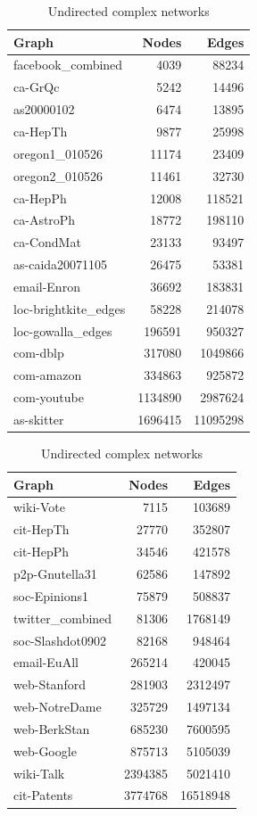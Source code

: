 \begin{table}[h!]
\parbox{.45\linewidth}{
\centering
\begin{tabular}{lrr}

\hline
 Graph                &   Nodes &    Edges \\
\hline
 facebook\_combined    &    4039 &    88234 \\
 ca-GrQc              &    5242 &    14496 \\
 as20000102           &    6474 &    13895 \\
 ca-HepTh             &    9877 &    25998 \\
 oregon1\_010526       &   11174 &    23409 \\
 oregon2\_010526       &   11461 &    32730 \\
 ca-HepPh             &   12008 &   118521 \\
 ca-AstroPh           &   18772 &   198110 \\
 ca-CondMat           &   23133 &    93497 \\
 as-caida20071105     &   26475 &    53381 \\
 email-Enron          &   36692 &   183831 \\
 loc-brightkite\_edges &   58228 &   214078 \\
 loc-gowalla\_edges    &  196591 &   950327 \\
 com-dblp      &  317080 &  1049866 \\
 com-amazon    &  334863 &   925872 \\
 com-youtube   & 1134890 &  2987624 \\
 as-skitter           & 1696415 & 11095298 \\
\hline
\end{tabular}
\caption{Undirected complex networks}

}
\hfill
\parbox{.45\linewidth}{
\centering
\begin{tabular}{lrr}
\hline
 Graph            &   Nodes &   Edges \\
\hline
 wiki-Vote        &    7115 &   103689 \\
 cit-HepTh        &   27770 &   352807 \\
 cit-HepPh        &   34546 &   421578 \\
 p2p-Gnutella31   &   62586 &   147892 \\
 soc-Epinions1    &   75879 &   508837 \\
 twitter\_combined &   81306 &  1768149 \\
 soc-Slashdot0902 &   82168 &   948464 \\
 email-EuAll      &  265214 &   420045 \\
 web-Stanford     &  281903 &  2312497 \\
 web-NotreDame    &  325729 &  1497134 \\
 web-BerkStan     &  685230 &  7600595 \\
 web-Google       &  875713 &  5105039 \\
 wiki-Talk        & 2394385 &  5021410 \\
 cit-Patents      & 3774768 & 16518948 \\
\hline
\end{tabular}

}
\end{table}
